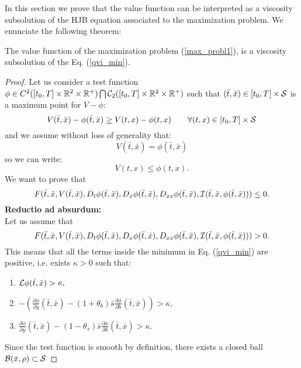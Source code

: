 In this section we prove that the value function can be interpreted as a viscosity subsolution of the HJB equation associated to the maximization problem. 
We enunciate the following theorem:
\begin{Theorem}\label{subsolution_th}
 The value function of the maximization problem (\ref{max_probl1}), is a viscosity subsolution of the Eq. (\ref{qvi_min}).
\end{Theorem}
\begin{proof}
Let us consider a test function $ \phi \in C^2([t_0,T] \times \mathbb{R}^2\times \mathbb{R}^+) \bigcap \mathcal{C}_2([t_0,T] \times \mathbb{R}^2\times \mathbb{R}^+)$ such that 
$(\bar t,\bar x) \in [t_0,T] \times \mathcal{S}$ is a maximum point for $V-\phi$:
\begin{equation}
 V(\bar t,\bar x) - \phi(\bar t,\bar x) \geq V(t,x) - \phi(t, x) \hspace{2em} \forall (t,x) \in [t_0,T] \times \mathcal{S}
\end{equation}
and we assume without loss of generality that:
\begin{equation}\label{max_point}
V(\bar t,\bar x) = \phi(\bar t,\bar x)  
\end{equation}
so we can write:
\begin{equation}\label{max_point2}
V(t,x) \leq \phi(t, x) .
\end{equation}
We want to prove that
$$ F(\bar t,\bar x,V(\bar t, \bar x),D_t \phi(\bar t, \bar x),D_x \phi(\bar t, \bar x),D_{xx}\phi(\bar t, \bar x),
\mathcal{I}(\bar t, \bar x,\phi(\bar t, \bar x))) \leq 0.  $$
\textbf{Reductio ad absurdum:}\\
Let us assume that 
$$F(\bar t,\bar x,V(\bar t, \bar x),D_t \phi(\bar t, \bar x),D_x \phi(\bar t, \bar x),D_{xx}\phi(\bar t, \bar x),
\mathcal{I}(\bar t,\bar x,\phi(\bar t, \bar x))) >0.$$ 
This means that all the terms inside the minimum in Eq. (\ref{qvi_min}) are positive, i.e. exists $\kappa >0$ such that:
\begin{enumerate}
 \item $ \mathcal{L} \phi(\bar t, \bar x) > \kappa ,$
 \item $-\left(\frac{\partial \phi}{\partial y}(\bar t, \bar x)
 -(1+\theta_b) \bar s \frac{\partial \phi}{\partial b}(\bar t, \bar x)\right) > \kappa,$
 \item $\frac{\partial \phi}{\partial y}(\bar t, \bar x)-(1-\theta_s) \bar s \frac{\partial \phi}{\partial b}(\bar t, \bar x) > \kappa.$
\end{enumerate}
Since the test function is smooth by definition, there exists a closed ball $\mathcal{B}(\bar x, \rho) \subset \mathcal{S}$

\end{proof}
